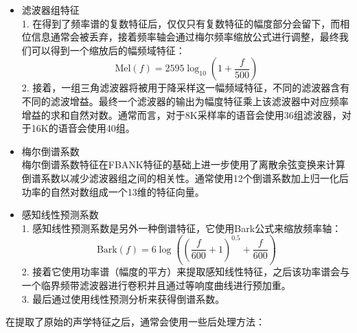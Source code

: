 \begin{itemize}
    \item 滤波器组特征 \\
    1. 在得到了频率谱的复数特征后，仅仅只有复数特征的幅度部分会留下，而相位信息通常会被丢弃，接着频率轴会通过梅尔频率缩放公式进行调整，最终我们可以得到一个缩放后的幅频域特征：
    \begin{equation}
        \text{Mel}(f)=2595 \log_{10}(1+\frac{f}{500}) 
    \end{equation}
    2. 接着，一组三角滤波器将被用于降采样这一幅频域特征，不同的滤波器含有不同的滤波增益。最终一个滤波器的输出为幅度特征乘上该滤波器中对应频率增益的求和自然对数。通常而言，对于8K采样率的语音会使用36组滤波器，对于16K的语音会使用40组。
    \item 梅尔倒谱系数 \\
    梅尔倒谱系数特征在FBANK特征的基础上进一步使用了离散余弦变换来计算倒谱系数以减少滤波器组之间的相关性。通常使用12个倒谱系数加上归一化后功率的自然对数组成一个13维的特征向量。
    \item 感知线性预测系数 \\
    1. 感知线性预测系数是另外一种倒谱特征，它使用Bark公式来缩放频率轴：
    \begin{equation}
        \text{Bark}(f)=6\log \left( \left( \frac{f}{600}+1 \right)^{0.5}+\frac{f}{600} \right)
    \end{equation}
    2. 接着它使用功率谱（幅度的平方）来提取感知线性特征，之后该功率谱会与一个临界频带滤波器进行卷积并且通过等响度曲线进行预加重。\\
    3. 最后通过使用线性预测分析来获得倒谱系数。
\end{itemize}
在提取了原始的声学特征之后，通常会使用一些后处理方法：
